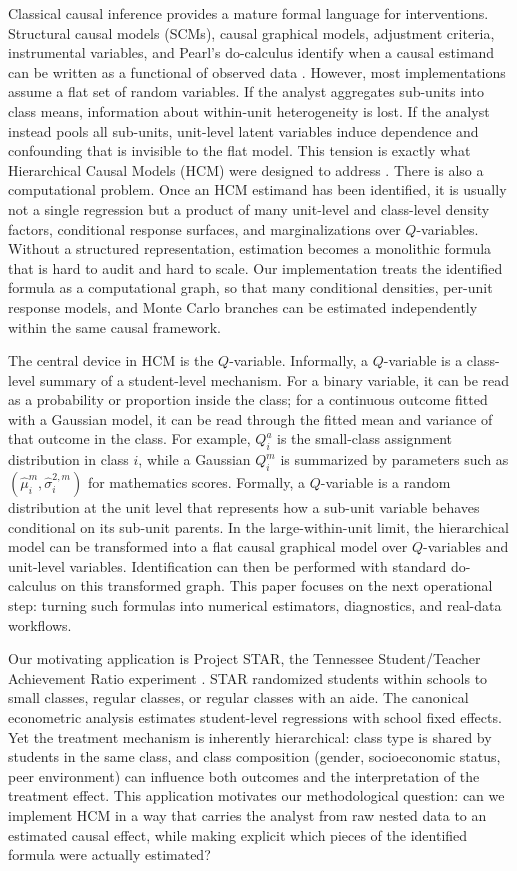 \documentclass[unnumsec,webpdf,contemporary,large]{oup-authoring-template}%
\theoremstyle{thmstyleone}%
\theoremstyle{thmstyletwo}%
\theoremstyle{thmstylethree}%
\begin{document}
Classical causal inference provides a mature formal language for interventions.
Structural causal models (SCMs), causal graphical models, adjustment criteria, instrumental variables, and Pearl's do-calculus identify when a causal estimand can be written as a functional of observed data \citep{Pearl2009,Imbens2015}.
However, most implementations assume a flat set of random variables.
If the analyst aggregates sub-units into class means, information about within-unit heterogeneity is lost.
If the analyst instead pools all sub-units, unit-level latent variables induce dependence and confounding that is invisible to the flat model.
This tension is exactly what Hierarchical Causal Models (HCM) were designed to address \citep{weinstein2023hcm}.
There is also a computational problem.
Once an HCM estimand has been identified, it is usually not a single regression but a product of many unit-level and class-level density factors, conditional response surfaces, and marginalizations over $Q$-variables.
Without a structured representation, estimation becomes a monolithic formula that is hard to audit and hard to scale.
Our implementation treats the identified formula as a computational graph, so that many conditional densities, per-unit response models, and Monte Carlo branches can be estimated independently within the same causal framework.

The central device in HCM is the $Q$-variable.
Informally, a $Q$-variable is a class-level summary of a student-level mechanism.
For a binary variable, it can be read as a probability or proportion inside the class; for a continuous outcome fitted with a Gaussian model, it can be read through the fitted mean and variance of that outcome in the class.
For example, $Q_i^a$ is the small-class assignment distribution in class $i$, while a Gaussian $Q_i^m$ is summarized by parameters such as $(\hat\mu_i^m,\hat\sigma_i^{2,m})$ for mathematics scores.
Formally, a $Q$-variable is a random distribution at the unit level that represents how a sub-unit variable behaves conditional on its sub-unit parents.
In the large-within-unit limit, the hierarchical model can be transformed into a flat causal graphical model over $Q$-variables and unit-level variables.
Identification can then be performed with standard do-calculus on this transformed graph.
This paper focuses on the next operational step: turning such formulas into numerical estimators, diagnostics, and real-data workflows.

Our motivating application is Project STAR, the Tennessee Student/Teacher Achievement Ratio experiment \citep{Krueger1999}.
STAR randomized students within schools to small classes, regular classes, or regular classes with an aide.
The canonical econometric analysis estimates student-level regressions with school fixed effects.
Yet the treatment mechanism is inherently hierarchical: class type is shared by students in the same class, and class composition (gender, socioeconomic status, peer environment) can influence both outcomes and the interpretation of the treatment effect.
This application motivates our methodological question: can we implement HCM in a way that carries the analyst from raw nested data to an estimated causal effect, while making explicit which pieces of the identified formula were actually estimated?
\end{document}
